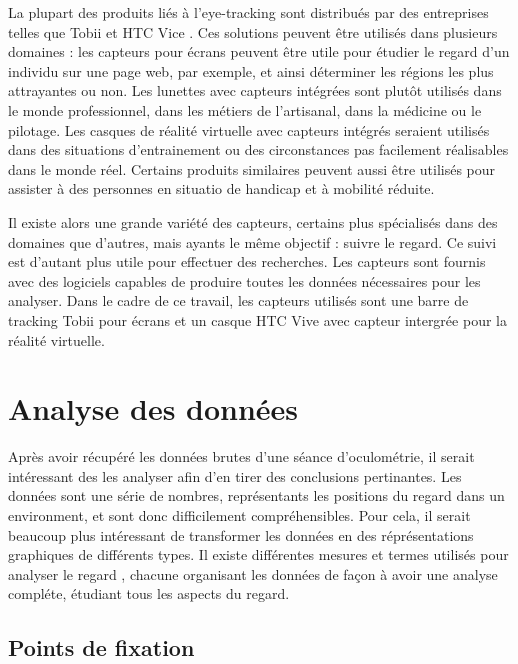 \documentclass[12pt]{article}
\begin{document}
\bigskip
La plupart des produits liés à l'eye-tracking sont distribués par des
entreprises telles que Tobii \cite{tobii} et HTC Vice \cite{htc_vive_pro_eye}.
Ces solutions peuvent être utilisés dans plusieurs domaines \cite{yt:tobii_vr}
: les capteurs pour écrans peuvent être utile pour étudier le regard d'un
individu sur une page web, par exemple, et ainsi déterminer les régions les
plus attrayantes ou non. Les lunettes avec capteurs intégrées sont plutôt
utilisés dans le monde professionnel, dans les métiers de l'artisanal, dans la
médicine ou le pilotage. Les casques de réalité virtuelle avec capteurs
intégrés seraient utilisés dans des situations d'entrainement ou des
circonstances pas facilement réalisables dans le monde réel. Certains produits
similaires peuvent aussi être utilisés pour assister à des personnes en
situatio de handicap et à mobilité réduite.

\bigskip
Il existe alors une grande variété des capteurs, certains plus spécialisés dans
des domaines que d'autres, mais ayants le même objectif : suivre le regard. Ce
suivi est d'autant plus utile pour effectuer des recherches. Les capteurs sont
fournis avec des logiciels capables de produire toutes les données nécessaires
pour les analyser. Dans le cadre de ce travail, les capteurs utilisés sont une
barre de tracking Tobii pour écrans et un casque HTC Vive avec capteur intergrée
pour la réalité virtuelle.


\section{Analyse des données}

Après avoir récupéré les données brutes d'une séance d'oculométrie, il serait
intéressant des les analyser afin d'en tirer des conclusions pertinantes. Les
données sont une série de nombres, représentants les positions du regard dans un
environment, et sont donc difficilement compréhensibles. Pour cela, il serait
beaucoup plus intéressant de transformer les données en des réprésentations
graphiques de différents types. Il existe différentes mesures et termes
utilisés pour analyser le regard \cite{imotions:metrics}, chacune organisant
les données de façon à avoir une analyse compléte, étudiant tous les aspects du
regard.

\subsection{Points de fixation}
\end{document}

